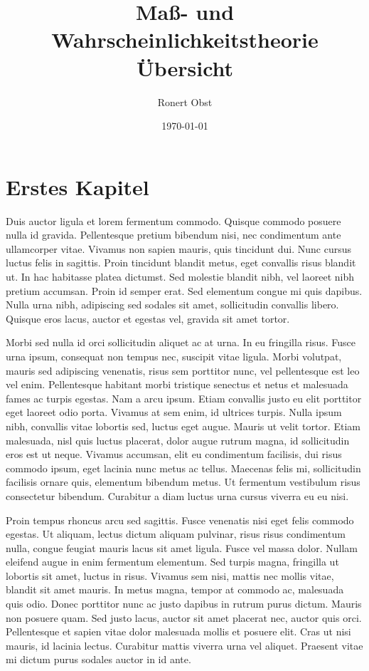 \documentclass[english]{luaminiontwocolumn}
\title{Maß- und Wahrscheinlichkeitstheorie Übersicht}
\author{Ronert Obst}
\date{\today}
\begin{document}
\maketitle

\setcounter{tocdepth}{3}
\tableofcontents
\vspace*{1cm}
\section{Erstes Kapitel}
\label{sec-1}

Duis auctor ligula et lorem fermentum commodo. Quisque commodo posuere nulla id gravida. Pellentesque pretium bibendum nisi, nec condimentum ante ullamcorper vitae. Vivamus non sapien mauris, quis tincidunt dui. Nunc cursus luctus felis in sagittis. Proin tincidunt blandit metus, eget convallis risus blandit ut. In hac habitasse platea dictumst. Sed molestie blandit nibh, vel laoreet nibh pretium accumsan. Proin id semper erat. Sed elementum congue mi quis dapibus. Nulla urna nibh, adipiscing sed sodales sit amet, sollicitudin convallis libero. Quisque eros lacus, auctor et egestas vel, gravida sit amet tortor.

Morbi sed nulla id orci sollicitudin aliquet ac at urna. In eu fringilla risus. Fusce urna ipsum, consequat non tempus nec, suscipit vitae ligula. Morbi volutpat, mauris sed adipiscing venenatis, risus sem porttitor nunc, vel pellentesque est leo vel enim. Pellentesque habitant morbi tristique senectus et netus et malesuada fames ac turpis egestas. Nam a arcu ipsum. Etiam convallis justo eu elit porttitor eget laoreet odio porta. Vivamus at sem enim, id ultrices turpis. Nulla ipsum nibh, convallis vitae lobortis sed, luctus eget augue. Mauris ut velit tortor. Etiam malesuada, nisl quis luctus placerat, dolor augue rutrum magna, id sollicitudin eros est ut neque. Vivamus accumsan, elit eu condimentum facilisis, dui risus commodo ipsum, eget lacinia nunc metus ac tellus. Maecenas felis mi, sollicitudin facilisis ornare quis, elementum bibendum metus. Ut fermentum vestibulum risus consectetur bibendum. Curabitur a diam luctus urna cursus viverra eu eu nisi.

Proin tempus rhoncus arcu sed sagittis. Fusce venenatis nisi eget felis commodo egestas. Ut aliquam, lectus dictum aliquam pulvinar, risus risus condimentum nulla, congue feugiat mauris lacus sit amet ligula. Fusce vel massa dolor. Nullam eleifend augue in enim fermentum elementum. Sed turpis magna, fringilla ut lobortis sit amet, luctus in risus. Vivamus sem nisi, mattis nec mollis vitae, blandit sit amet mauris. In metus magna, tempor at commodo ac, malesuada quis odio. Donec porttitor nunc ac justo dapibus in rutrum purus dictum. Mauris non posuere quam. Sed justo lacus, auctor sit amet placerat nec, auctor quis orci. Pellentesque et sapien vitae dolor malesuada mollis et posuere elit. Cras ut nisi mauris, id lacinia lectus. Curabitur mattis viverra urna vel aliquet. Praesent vitae mi dictum purus sodales auctor in id ante.
\end{document}
